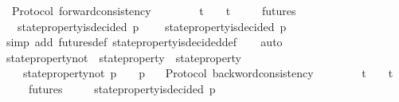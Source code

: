\begin{isabellebody}
\isanewline
\isanewline
{}\isamarkupfalse%
\ {\isacharparenleft}\ Protocol{\isacharparenright}\ forward{\isacharunderscore}consistency\ {\isacharcolon}\isanewline
\ \ {\isachardoublequoteopen}{\isasymforall}\ {\isasymsigma}{\isacharprime}\ {\isasymsigma}{\isachardot}\ {\isasymsigma}{\isacharprime}\ {\isasymin}\ {\isasymSigma}t\ {\isasymand}\ {\isasymsigma}\ {\isasymin}\ {\isasymSigma}t\isanewline
\ \ {\isasymlongrightarrow}\ {\isasymsigma}{\isacharprime}\ {\isasymin}\ futures\ {\isasymsigma}\ \isanewline
\ \ {\isasymlongrightarrow}\ state{\isacharunderscore}property{\isacharunderscore}is{\isacharunderscore}decided\ {\isacharparenleft}p{\isacharcomma}\ {\isasymsigma}{\isacharparenright}\isanewline
\ \ {\isasymlongrightarrow}\ state{\isacharunderscore}property{\isacharunderscore}is{\isacharunderscore}decided\ {\isacharparenleft}p{\isacharcomma}\ {\isasymsigma}{\isacharprime}{\isacharparenright}{\isachardoublequoteclose}\isanewline
%
\isadelimproof
\ \ %
\endisadelimproof
%
\isatagproof
{}\isamarkupfalse%
\ {\isacharparenleft}simp\ add{\isacharcolon}\ futures{\isacharunderscore}def\ state{\isacharunderscore}property{\isacharunderscore}is{\isacharunderscore}decided{\isacharunderscore}def{\isacharparenright}\isanewline
\ \ \isamarkupfalse%
\ auto%
\endisatagproof
{\isafoldproof}%
%
\isadelimproof
\isanewline
%
\endisadelimproof
\isanewline
\isanewline
{}\isamarkupfalse%
\ state{\isacharunderscore}property{\isacharunderscore}not\ {\isacharcolon}{\isacharcolon}\ {\isachardoublequoteopen}state{\isacharunderscore}property\ {\isasymRightarrow}\ state{\isacharunderscore}property{\isachardoublequoteclose}\isanewline
\ \ \isanewline
\ \ \ \ {\isachardoublequoteopen}state{\isacharunderscore}property{\isacharunderscore}not\ p\ {\isacharequal}\ {\isacharparenleft}{\isasymlambda}{\isasymsigma}{\isachardot}\ {\isacharparenleft}{\isasymnot}\ p\ {\isasymsigma}{\isacharparenright}{\isacharparenright}{\isachardoublequoteclose}\isanewline
\isanewline
{}\isamarkupfalse%
\ {\isacharparenleft}\ Protocol{\isacharparenright}\ backword{\isacharunderscore}consistency\ {\isacharcolon}\isanewline
\ \ {\isachardoublequoteopen}{\isasymforall}\ {\isasymsigma}{\isacharprime}\ {\isasymsigma}{\isachardot}\ {\isasymsigma}{\isacharprime}\ {\isasymin}\ {\isasymSigma}t\ {\isasymand}\ {\isasymsigma}\ {\isasymin}\ {\isasymSigma}t\isanewline
\ \ {\isasymlongrightarrow}\ {\isasymsigma}{\isacharprime}\ {\isasymin}\ futures\ {\isasymsigma}\ \isanewline
\ \ {\isasymlongrightarrow}\ state{\isacharunderscore}property{\isacharunderscore}is{\isacharunderscore}decided\ {\isacharparenleft}p{\isacharcomma}\ {\isasymsigma}{\isacharprime}{\isacharparenright}\isanewline

\end{isabellebody}
